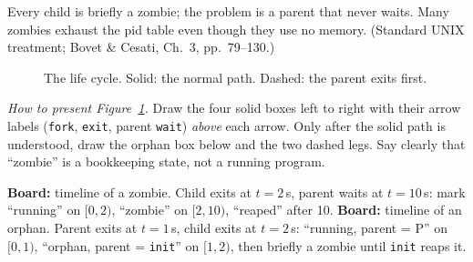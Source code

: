 \documentclass[11pt]{article}
\begin{document}
Every child is briefly a zombie; the problem is a parent that never waits. Many zombies exhaust the pid table even though they use no memory. (Standard UNIX treatment; Bovet \& Cesati, Ch.~3, pp.~79--130.)

\begin{figure}[h]
\centering
\caption{The life cycle. Solid: the normal path. Dashed: the parent exits first.}
\label{fig:lifecycle}
\end{figure}

\emph{How to present Figure~\ref{fig:lifecycle}.} Draw the four solid boxes left to right with their arrow labels (\texttt{fork}, \texttt{exit}, parent \texttt{wait}) \emph{above} each arrow. Only after the solid path is understood, draw the orphan box below and the two dashed legs. Say clearly that ``zombie'' is a bookkeeping state, not a running program.

\textbf{Board:} timeline of a zombie. Child exits at $t=2$\,s, parent waits at $t=10$\,s: mark ``running'' on $[0,2)$, ``zombie'' on $[2,10)$, ``reaped'' after 10. \textbf{Board:} timeline of an orphan. Parent exits at $t=1$\,s, child exits at $t=2$\,s: ``running, parent = P'' on $[0,1)$, ``orphan, parent = \texttt{init}'' on $[1,2)$, then briefly a zombie until \texttt{init} reaps it.
\end{document}
